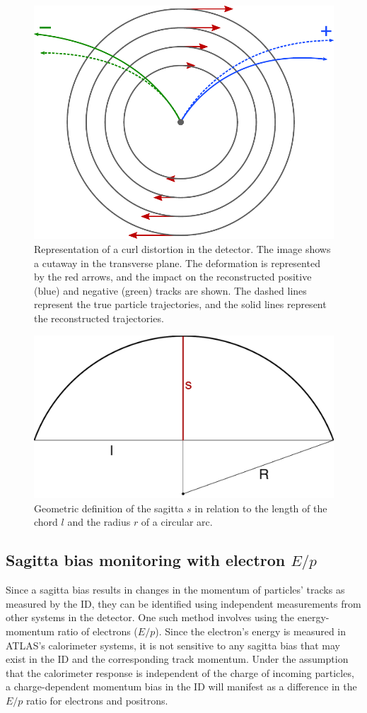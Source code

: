 \begin{figure}[htbp]
  \centering
  \includegraphics[width=.45\textwidth]{figs/alignment/radial-distortion}
  \caption{Representation of a curl distortion in the detector.  The image shows a cutaway in the transverse plane.  The deformation is represented by the red arrows, and the impact on the reconstructed positive (blue) and negative (green) tracks are shown.  The dashed lines represent the true particle trajectories, and the solid lines represent the reconstructed trajectories.}
  \label{fig:align_radial_distortion}
\end{figure}

\begin{figure}[htbp]
  \centering
  \includegraphics[width=.4\textwidth]{figs/alignment/sagitta}
  \caption{Geometric definition of the sagitta $s$ in relation to the length of the chord $l$ and the radius $r$ of a circular arc.}
  \label{fig:align_sagitta}
\end{figure}

\subsection{Sagitta bias monitoring with electron $E/p$}\label{align:eop}
Since a sagitta bias results in changes in the momentum of particles' tracks as measured by the ID, they can be identified using independent measurements from other systems in the detector.
One such method involves using the energy-momentum ratio of electrons ($E/p$).
Since the electron's energy is measured in ATLAS's calorimeter systems, it is not sensitive to any sagitta bias that may exist in the ID and the corresponding track momentum.
Under the assumption that the calorimeter response is independent of the charge of incoming particles, a charge-dependent momentum bias in the ID will manifest as a difference in the $E/p$ ratio for electrons and positrons.%

